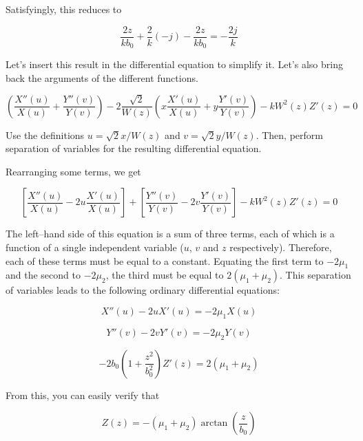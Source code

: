 Satisfyingly, this reduces to

\begin{equation}
\frac{2z}{k b_0}  + \frac{2}{k}(-j) - \frac{2z}{k b_0} = - \frac{2j}{k}
\end{equation}

Let's insert this result in the differential equation to simplify it. Let's also bring back the arguments of the different functions.

\begin{equation}
  \left(\frac{X''(u)}{X(u)}+\frac{Y''(v)}{Y(v)}\right)  
  - 2  \frac{\sqrt{2}}{W(z)}\left(x\frac{X'(u)}{X(u)}+y\frac{Y'(v)}{Y(v)}\right)
  -kW^2(z)Z'(z) = 0
  \end{equation} 

\begin{cue}
Use the definitions $u = \sqrt{2} x / W(z)$ and  $v = \sqrt{2} y / W(z)$. Then, perform separation of variables for the resulting differential equation. 
\end{cue}

Rearranging some terms, we get

\begin{equation}
\left[{\frac{X''(u)}{X(u)} - 2 u\frac{X'(u)}{X(u)}}\right] + 
\left[{\frac{Y''(v)}{Y(v)} - 2 v\frac{Y'(v)}{Y(v)}}\right] -kW^2(z)Z'(z) = 0
\end{equation} 

The left--hand side of this equation is a sum of three terms, each of which is a function of a single independent variable ($u$, $v$ and $z$ respectively). Therefore, each of these terms must be equal to a constant. Equating the first term to $-2\mu_1$ and the second to $-2\mu_2$, the third must be equal to $2(\mu_1+\mu_2)$. This separation of variables leads to the following ordinary differential equations:

\begin{equation}
X''(u) - 2 u X'(u) = - 2 \mu_1 X(u) 
\end{equation} 

\begin{equation}
Y''(v) - 2 v Y'(v) = - 2 \mu_2 Y(v)
\end{equation} 

\begin{equation}
-2b_0\left(1 + \frac{z^2}{b_0^2}\right)Z'(z) = 2(\mu_1+\mu_2)
\end{equation} 

From this, you can easily verify that 

$$Z(z) = -(\mu_1+\mu_2) \arctan\left(\frac{z}{b_0}\right)$$

